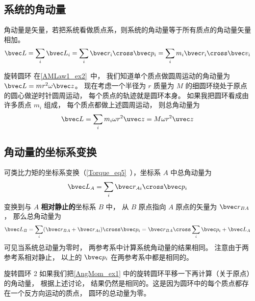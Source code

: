 

\subsection{系统的角动量}
角动量是矢量，若把系统看做质点系，则系统的角动量等于所有质点的角动量矢量相加。
\begin{equation}\label{AngMom_eq1}
\bvec L = \sum_i \bvec L_i = \sum_i \bvec r_i \cross\bvec p_i = \sum_i m_i \bvec r_i \cross\bvec v_i
\end{equation}
\begin{example}{旋转圆环}\label{AngMom_ex1}
在\autoref{AMLaw1_ex2}~中， 我们知道单个质点做圆周运动的角动量为 $\bvec L = m r^2 \omega \bvec z$。 现在考虑一个半径为 $r$ 质量为 $M$ 的细圆环绕处于原点的圆心做逆时针圆周运动， 每个质点的轨迹就是圆环本身。 如果我把圆环看成由许多质点 $m_i$ 组成， 每个质点都做上述圆周运动， 则总角动量为
\begin{equation}
\bvec L = \sum_i m_i \omega r^2 \uvec z = M \omega r^2 \uvec z
\end{equation}
\end{example}

\subsection{角动量的坐标系变换}
可类比力矩的坐标系变换（\autoref{Torque_eq5}~），坐标系 $A$ 中总角动量为
\begin{equation}
\bvec L_A = \sum_i \bvec r_{Ai} \cross \bvec p_i 
\end{equation}
变换到与 $A$ \textbf{相对静止的}坐标系 $B$ 中， 从 $B$ 原点指向 $A$ 原点的矢量为 $\bvec r_{BA}$， 那么总角动量为
\begin{equation}\label{AngMom_eq4}
\bvec L_B = \sum_i (\bvec r_{BA} + \bvec r_{Ai})\cross \bvec p_i = \bvec r_{BA}\cross \sum_i \bvec p_i + \bvec L_A
\end{equation}
可见当系统总动量为零时， 两参考系中计算系统角动量的结果相同。 注意由于两参考系相对静止， 以上的 $\bvec p_i$ 在两参考系中都是相同的。

\begin{example}{旋转圆环 2}\label{AngMom_ex2}
如果我们把\autoref{AngMom_ex1} 中的旋转圆环平移一下再计算（关于原点）的角动量， 根据上述讨论， 结果仍然是相同的。这是因为圆环中的每个质点都存在一个反方向运动的质点， 圆环的总动量为零。
\end{example}

